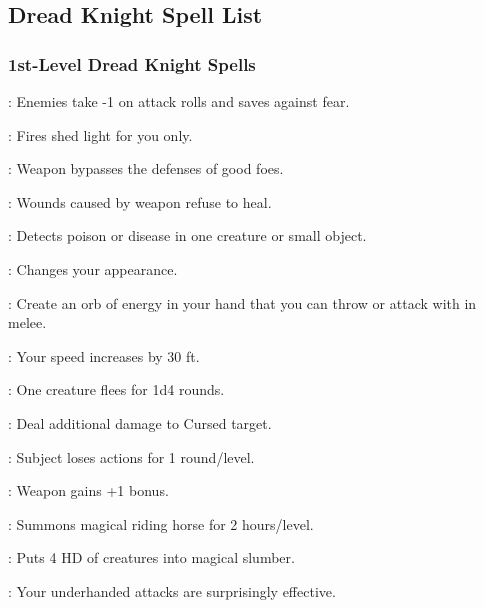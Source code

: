 \subsection{Dread Knight Spell List}
\subsubsection{1st-Level Dread Knight Spells}
\begin{list}{}{\leftmargin=1em}
\item {}: Enemies take -1 on attack rolls and saves against fear.
\item {}: Fires shed light for you only.
\item {}: Weapon bypasses the defenses of good foes.
\item {}: Wounds caused by weapon refuse to heal.
\item {}: Detects poison or disease in one creature or small object.
\item {}: Changes your appearance.
\item {}: Create an orb of energy in your hand that you can throw or attack with in melee.
\item {}: Your speed increases by 30 ft.
\item {}: One creature flees for 1d4 rounds.
\item {}: Deal additional damage to Cursed target.
\item {}: Subject loses actions for 1 round/level.
\item {}: Weapon gains +1 bonus.
\item {}: Summons magical riding horse for 2 hours/level.
\item {}: Puts 4 HD of creatures into magical slumber.
\item {}: Your underhanded attacks are surprisingly effective.
\end{list}
